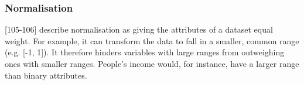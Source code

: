 
\subsubsection{Normalisation}
\label{section:Normalisation}



\textcite{han2011data}[105-106] describe normalisation as giving the attributes of a dataset equal weight. For example, it can transform the data to fall in a smaller, common range (e.g. [-1, 1]). It therefore hinders variables with large ranges from outweighing ones with smaller ranges. People's income would, for instance, have a larger range than binary attributes. 

